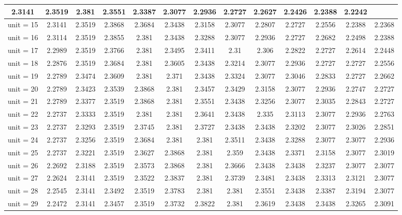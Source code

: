\begin{table*}[ht]
\begin{tabular}{|c|c|c|c|c|c|c|c|c|c|c|c|c|}
2.3141 & 2.3519 & 2.381 & 2.3551 & 2.3387 & 2.3077 & 2.2936 & 2.2727 & 2.2627 & 2.2426 & 2.2388 & 2.2242 \\
\hline
unit = 15 &
2.3141 & 2.3519 & 2.3868 & 2.3684 & 2.3438 & 2.3158 & 2.3077 & 2.2807 & 2.2727 & 2.2556 & 2.2388 & 2.2368 \\
\hline
unit = 16 &
2.3114 & 2.3519 & 2.3855 & 2.381 & 2.3438 & 2.3288 & 2.3077 & 2.2936 & 2.2727 & 2.2682 & 2.2498 & 2.2388 \\
\hline
unit = 17 &
2.2989 & 2.3519 & 2.3766 & 2.381 & 2.3495 & 2.3411 & 2.31 & 2.306 & 2.2822 & 2.2727 & 2.2614 & 2.2448 \\
\hline
unit = 18 &
2.2876 & 2.3519 & 2.3684 & 2.381 & 2.3605 & 2.3438 & 2.3214 & 2.3077 & 2.2936 & 2.2727 & 2.2727 & 2.2556 \\
\hline
unit = 19 &
2.2789 & 2.3474 & 2.3609 & 2.381 & 2.371 & 2.3438 & 2.3324 & 2.3077 & 2.3046 & 2.2833 & 2.2727 & 2.2662 \\
\hline
unit = 20 &
2.2789 & 2.3423 & 2.3539 & 2.3868 & 2.381 & 2.3457 & 2.3429 & 2.3158 & 2.3077 & 2.2936 & 2.2747 & 2.2727 \\
\hline
unit = 21 &
2.2789 & 2.3377 & 2.3519 & 2.3868 & 2.381 & 2.3551 & 2.3438 & 2.3256 & 2.3077 & 2.3035 & 2.2843 & 2.2727 \\
\hline
unit = 22 &
2.2737 & 2.3333 & 2.3519 & 2.381 & 2.381 & 2.3641 & 2.3438 & 2.335 & 2.3113 & 2.3077 & 2.2936 & 2.2763 \\
\hline
unit = 23 &
2.2737 & 2.3293 & 2.3519 & 2.3745 & 2.381 & 2.3727 & 2.3438 & 2.3438 & 2.3202 & 2.3077 & 2.3026 & 2.2851 \\
\hline
unit = 24 &
2.2737 & 2.3256 & 2.3519 & 2.3684 & 2.381 & 2.381 & 2.3511 & 2.3438 & 2.3288 & 2.3077 & 2.3077 & 2.2936 \\
\hline
unit = 25 &
2.2737 & 2.3221 & 2.3519 & 2.3627 & 2.3868 & 2.381 & 2.359 & 2.3438 & 2.3371 & 2.3158 & 2.3077 & 2.3019 \\
\hline
unit = 26 &
2.2692 & 2.3188 & 2.3519 & 2.3573 & 2.3868 & 2.381 & 2.3666 & 2.3438 & 2.3438 & 2.3237 & 2.3077 & 2.3077 \\
\hline
unit = 27 &
2.2624 & 2.3141 & 2.3519 & 2.3522 & 2.3837 & 2.381 & 2.3739 & 2.3481 & 2.3438 & 2.3313 & 2.3121 & 2.3077 \\
\hline
unit = 28 &
2.2545 & 2.3141 & 2.3492 & 2.3519 & 2.3783 & 2.381 & 2.381 & 2.3551 & 2.3438 & 2.3387 & 2.3194 & 2.3077 \\
\hline
unit = 29 &
2.2472 & 2.3141 & 2.3457 & 2.3519 & 2.3732 & 2.3822 & 2.381 & 2.3619 & 2.3438 & 2.3438 & 2.3265 & 2.3091 \\

\end{tabular}
\end{table*}

